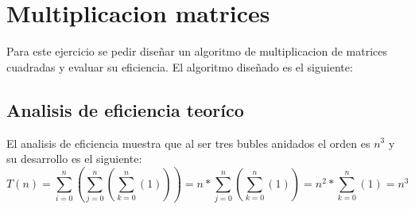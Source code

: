\section{Multiplicacion matrices}

Para este ejercicio se pedir diseñar un algoritmo de multiplicacion de matrices cuadradas y evaluar su eficiencia. El algoritmo diseñado es el siguiente:


\subsection{Analisis de eficiencia teoríco}

El analisis de eficiencia muestra que al ser tres bubles anidados el orden es $n^{3}$ y su desarrollo es el siguiente:
\begin{equation}
T(n)=\sum_{i=0}^{n}(\sum_{j=0}^{n}(\sum_{k=0}^{n}(1)))=n*\sum_{j=0}^{n}(\sum_{k=0}^{n}(1))=n^{2}*\sum_{k=0}^{n}(1)=n^{3}
\end{equation}